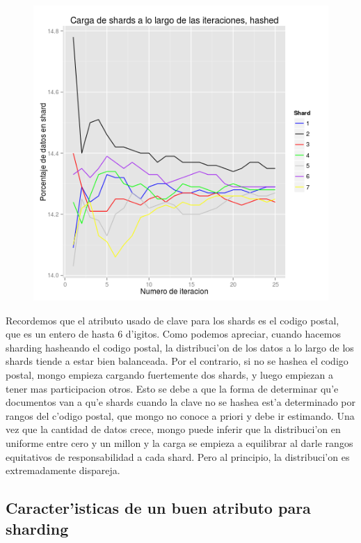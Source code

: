\begin{figure}[H]
	\begin{center}
		\includegraphics[scale=0.6]{imagenes/siete_shards_hashed.png}
	\end{center}
\end{figure}

Recordemos que el atributo usado de clave para los shards es el codigo postal, que es un entero de hasta 6 d'igitos. Como podemos apreciar, cuando hacemos sharding hasheando el codigo postal, la distribuci'on de los datos a lo largo de los shards tiende a estar bien balanceada. Por el contrario, si no se hashea el codigo postal, mongo empieza cargando fuertemente dos shards, y luego empiezan a tener mas participacion otros. Esto se debe a que la forma de determinar qu'e documentos van a qu'e shards cuando la clave no se hashea est'a determinado por rangos del c'odigo postal, que mongo no conoce a priori y debe ir estimando. Una vez que la cantidad de datos crece, mongo puede inferir que la distribuci'on en uniforme entre cero y un millon y la carga se empieza a equilibrar al darle rangos equitativos de responsabilidad a cada shard. Pero al principio, la distribuci'on es extremadamente dispareja.

\subsection{Caracter'isticas de un buen atributo para sharding}

